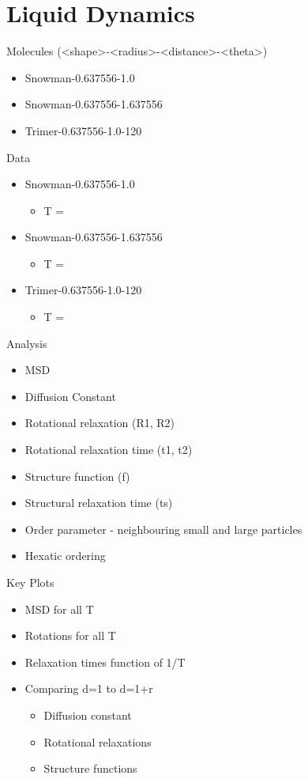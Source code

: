 \chapter{Liquid Dynamics}

Molecules (<shape>-<radius>-<distance>-<theta>)
\begin{itemize}
    \item Snowman-0.637556-1.0
    \item Snowman-0.637556-1.637556
    \item Trimer-0.637556-1.0-120
\end{itemize}


Data
\begin{itemize}
    \item Snowman-0.637556-1.0
        \begin{itemize}
            \item T = 
        \end{itemize}
    \item Snowman-0.637556-1.637556
        \begin{itemize}
            \item T = 
        \end{itemize}
    \item Trimer-0.637556-1.0-120
        \begin{itemize}
            \item T = 
        \end{itemize}
\end{itemize}


Analysis
\begin{itemize}
    \item MSD
    \item Diffusion Constant
    \item Rotational relaxation (R1, R2)
    \item Rotational relaxation time (t1, t2)
    \item Structure function (f)
    \item Structural relaxation time (ts)
    \item Order parameter - neighbouring small and large particles
    \item Hexatic ordering
\end{itemize}

Key Plots
\begin{itemize}
    \item MSD for all T
    \item Rotations for all T
    \item Relaxation times function of 1/T
    \item Comparing d=1 to d=1+r
        \begin{itemize}
            \item Diffusion constant
            \item Rotational relaxations
            \item Structure functions
        \end{itemize}
\end{itemize}


